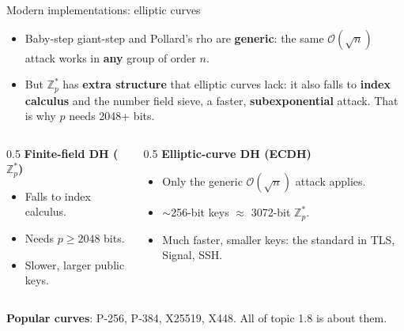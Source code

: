 \ifdefined\PRESENTATION\else\PassOptionsToClass{handout}{beamer}\fi\documentclass[aspectratio=169, lualatex]{beamer}
\begin{document}
\begin{frame}{Modern implementations: elliptic curves}
	\begin{itemize}[<+->]
		\item Baby-step giant-step and Pollard's rho are \textbf{generic}: the same $\mathcal{O}(\sqrt{n})$ attack works in \textbf{any} group of order $n$.
		\item But $\mathbb{Z}_p^*$ has \textbf{extra structure} that elliptic curves lack: it also falls to \textbf{index calculus} and the number field sieve, a faster, \textbf{subexponential} attack. That is why $p$ needs 2048+ bits.
	\end{itemize}
	\vspace{0.2cm}
	\begin{columns}[c]
		\begin{column}{0.5\textwidth}
			\textbf{Finite-field DH ($\mathbb{Z}_p^*$)}
			\begin{itemize}[<+->]
				\item Falls to index calculus.
				\item Needs $p \geq 2048$ bits.
				\item Slower, larger public keys.
			\end{itemize}
		\end{column}
		\begin{column}{0.5\textwidth}
			\textbf{Elliptic-curve DH (ECDH)}
			\begin{itemize}[<+->]
				\item Only the generic $\mathcal{O}(\sqrt{n})$ attack applies.
				\item $\sim$256-bit keys $\approx$ 3072-bit $\mathbb{Z}_p^*$.
				\item Much faster, smaller keys: the standard in TLS, Signal, SSH.
			\end{itemize}
		\end{column}
	\end{columns}
	\vspace{0.2cm}
	\pause
	\textbf{Popular curves}: P-256, P-384, X25519, X448. All of topic 1.8 is about them.
\end{frame}
\end{document}

